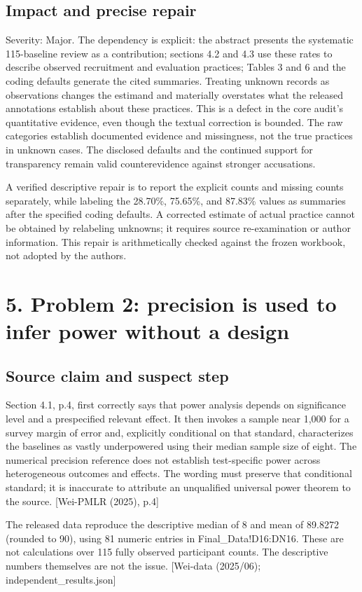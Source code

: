 \documentclass[10pt]{article}
\begin{document}
\subsection*{Impact and precise repair}
Severity: Major. The dependency is explicit: the abstract presents the systematic 115-baseline review as a contribution; sections 4.2 and 4.3 use these rates to describe observed recruitment and evaluation practices; Tables 3 and 6 and the coding defaults generate the cited summaries. Treating unknown records as observations changes the estimand and materially overstates what the released annotations establish about these practices. This is a defect in the core audit’s quantitative evidence, even though the textual correction is bounded. The raw categories establish documented evidence and missingness, not the true practices in unknown cases. The disclosed defaults and the continued support for transparency remain valid counterevidence against stronger accusations.\par
A verified descriptive repair is to report the explicit counts and missing counts separately, while labeling the 28.70\%, 75.65\%, and 87.83\% values as summaries after the specified coding defaults. A corrected estimate of actual practice cannot be obtained by relabeling unknowns; it requires source re-examination or author information. This repair is arithmetically checked against the frozen workbook, not adopted by the authors.\par
\section*{5. Problem 2: precision is used to infer power without a design}
\subsection*{Source claim and suspect step}
Section 4.1, p.4, first correctly says that power analysis depends on significance level and a prespecified relevant effect. It then invokes a sample near 1,000 for a survey margin of error and, explicitly conditional on that standard, characterizes the baselines as vastly underpowered using their median sample size of eight. The numerical precision reference does not establish test-specific power across heterogeneous outcomes and effects. The wording must preserve that conditional standard; it is inaccurate to attribute an unqualified universal power theorem to the source. [Wei-PMLR (2025), p.4]\par
The released data reproduce the descriptive median of 8 and mean of 89.8272 (rounded to 90), using 81 numeric entries in Final\_Data!D16:DN16. These are not calculations over 115 fully observed participant counts. The descriptive numbers themselves are not the issue. [Wei-data (2025/06); independent\_results.json]\par
\end{document}
